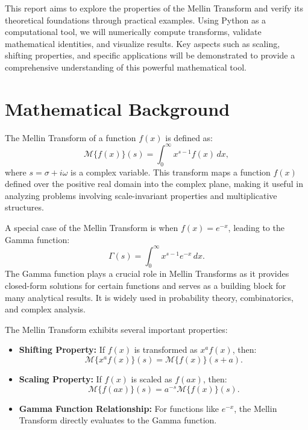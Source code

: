 \documentclass[a4paper, 12pt]{article}
\begin{document}
This report aims to explore the properties of the Mellin Transform and verify its theoretical foundations through practical examples. Using Python as a computational tool, we will numerically compute transforms, validate mathematical identities, and visualize results. Key aspects such as scaling, shifting properties, and specific applications will be demonstrated to provide a comprehensive understanding of this powerful mathematical tool.

\section{Mathematical Background}
The Mellin Transform of a function $f(x)$ is defined as:
\begin{equation}
\mathcal{M}\{f(x)\}(s) = \int_{0}^{\infty} x^{s-1} f(x) \, dx,
\end{equation}
where $s = \sigma + i\omega$ is a complex variable. This transform maps a function $f(x)$ defined over the positive real domain into the complex plane, making it useful in analyzing problems involving scale-invariant properties and multiplicative structures.

A special case of the Mellin Transform is when $f(x) = e^{-x}$, leading to the Gamma function:
\begin{equation}
\Gamma(s) = \int_{0}^{\infty} x^{s-1} e^{-x} \, dx.
\end{equation}
The Gamma function plays a crucial role in Mellin Transforms as it provides closed-form solutions for certain functions and serves as a building block for many analytical results. It is widely used in probability theory, combinatorics, and complex analysis.

The Mellin Transform exhibits several important properties:
\begin{itemize}
    \item \textbf{Shifting Property:} If $f(x)$ is transformed as $x^a f(x)$, then:
    \begin{equation}
    \mathcal{M}\{x^a f(x)\}(s) = \mathcal{M}\{f(x)\}(s + a).
    \end{equation}
    \item \textbf{Scaling Property:} If $f(x)$ is scaled as $f(ax)$, then:
    \begin{equation}
    \mathcal{M}\{f(ax)\}(s) = a^{-s} \mathcal{M}\{f(x)\}(s).
    \end{equation}
    \item \textbf{Gamma Function Relationship:} For functions like $e^{-x}$, the Mellin Transform directly evaluates to the Gamma function.
\end{itemize}
\end{document}
